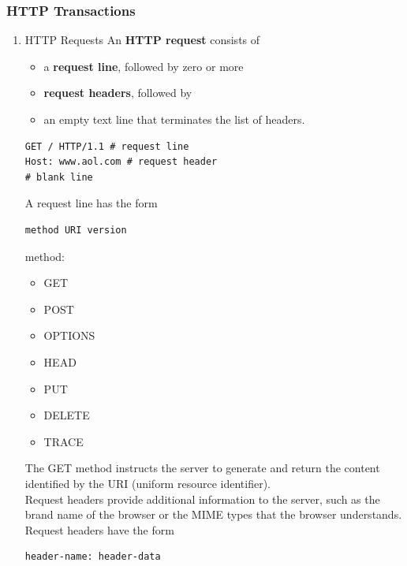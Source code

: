 \documentclass[11pt]{article}
\begin{document}
\subsubsection{HTTP Transactions}
\label{sec:orgc126440}

\begin{enumerate}
\item HTTP Requests
\label{sec:org1261ccc}
An \textbf{HTTP request} consists of\\
\begin{itemize}
\item a \textbf{request line}, followed by zero or more\\
\item \textbf{request headers}, followed by\\
\item an empty text line that terminates the list of headers.\\
\end{itemize}
\begin{verbatim}
GET / HTTP/1.1 # request line 
Host: www.aol.com # request header
# blank line

\end{verbatim}


A request line has the form\\
\begin{verbatim}
method URI version
\end{verbatim}

method:\\
\begin{itemize}
\item GET\\
\item POST\\
\item OPTIONS\\
\item HEAD\\
\item PUT\\
\item DELETE\\
\item TRACE\\
\end{itemize}

The GET method instructs the server to generate and return the content identified by the URI (uniform resource identifier).\\


Request headers provide additional information to the server, such as the brand name of the browser or the MIME types that the browser understands. Request headers have the form\\
\begin{verbatim}
header-name: header-data
\end{verbatim}


\end{enumerate}
\end{document}
